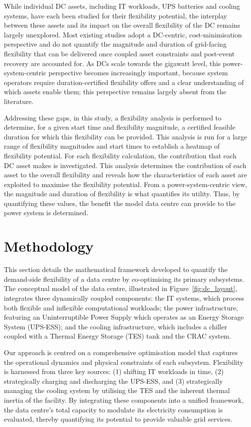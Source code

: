 \documentclass[lettersize,journal]{IEEEtran}
\newcommand{\rev}[1]{#1}
\begin{document}
\rev{While individual DC assets, including IT workloads, UPS batteries and cooling systems, have each been studied for their flexibility potential, the interplay between these assets and its impact on the overall flexibility of the DC remains largely unexplored. Most existing studies adopt a DC-centric, cost-minimisation perspective and do not quantify the magnitude and duration of grid-facing flexibility that can be delivered once coupled asset constraints and post-event recovery are accounted for. As DCs scale towards the gigawatt level, this power-system-centric perspective becomes increasingly important, because system operators require duration-certified flexibility offers and a clear understanding of which assets enable them; this perspective remains largely absent from the literature.}

Addressing these gaps, in this study, a flexibility analysis is performed to determine, for a given start time and flexibility magnitude, a certified feasible duration for which this flexibility can be provided. This analysis is run for a large range of flexibility magnitudes and start times to establish a heatmap of flexibility potential. For each flexibility calculation, the contribution that each DC asset makes is investigated. This analysis determines the contribution of each asset to the overall flexibility and reveals how the characteristics of each asset are exploited to maximise the flexibility potential. From a power-system-centric view, the magnitude and duration of flexibility is what quantifies its utility. Thus, by quantifying these values, the benefit the model data centre can provide to the power system is determined. 

\section{Methodology}
This section details the mathematical framework developed to quantify the demand-side flexibility of a data centre by co-optimising its primary subsystems. The conceptual model of the data centre, illustrated in Figure~\ref{fig:dc_layout}, integrates three dynamically coupled components: the IT systems, which process both flexible and inflexible computational workloads; the power infrastructure, featuring an Uninterruptible Power Supply which operates as an Energy Storage System (UPS-ESS); and the cooling infrastructure, which includes a chiller coupled with a Thermal Energy Storage (TES) tank and the CRAC system. 

Our approach is centred on a comprehensive optimisation model that captures the operational dynamics and physical constraints of each subsystem. Flexibility is harnessed from three key sources: (1) shifting  IT workloads in time, (2) strategically charging and discharging the UPS-ESS, and (3) strategically managing the cooling system by utilising the TES and the inherent thermal inertia of the facility. By integrating these components into a unified framework, the data centre's total capacity to modulate its electricity consumption is evaluated, thereby quantifying its potential to provide valuable grid services.
\end{document}
